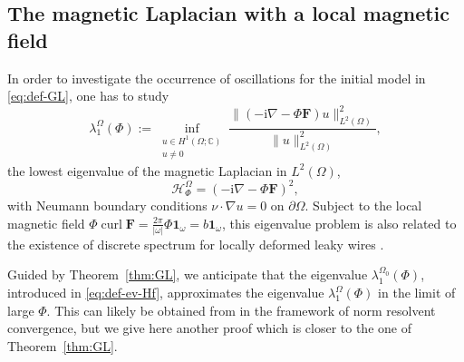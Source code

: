 \documentclass[11pt]{amsart}
\DeclareMathOperator{\curl}{curl}
\newcommand{\C}{\mathbb C}
\newcommand{\Hb}{\mathcal{H}_\Phi^{\Omega}}
\newcommand{\Fb}{\mathbf F}
\newcommand{\ii}{\mathrm i}
\theoremstyle{definition}
\numberwithin{equation}{section}
\begin{document}
\subsection{The magnetic Laplacian with a local magnetic field}
%
In order to  investigate the occurrence of oscillations for the initial model in \eqref{eq:def-GL}, one has to study
\begin{equation}\label{eq:ev-H-B}
\lambda_1^\Omega(\Phi):=\inf_{\substack{u\in H^1(\Omega;\C)\\u\not=0}}\frac{\|(-\ii\nabla-\Phi\Fb)u\|^2_{L^2(\Omega)}}{\|u\|^2_{L^2(\Omega)}},
\end{equation}
 the lowest eigenvalue of the magnetic Laplacian  in $L^2(\Omega)$,
\begin{equation}\label{eq:def-op-Om}
    \Hb= (-\ii\nabla - \Phi\Fb)^2,
\end{equation}
with Neumann boundary conditions $\nu\cdot \nabla u=0$ on \(\partial\Omega\). Subject to the local magnetic field $\Phi\curl\Fb=\frac{2\pi}{|\omega|}\Phi\mathbf 1_\omega=b\mathbf 1_\omega$, this eigenvalue problem is also related to the existence of discrete spectrum for locally deformed leaky wires \cite{BE}.

Guided by Theorem~\ref{thm:GL}, we anticipate that the eigenvalue $\lambda_1^{\Omega_0}(\Phi)$, introduced in \eqref{eq:def-ev-Hf}, approximates the eigenvalue
$\lambda_1^\Omega(\Phi)$ in the limit of large $\Phi$. This can likely be obtained from \cite{HN} in the framework of norm resolvent convergence, but we give here another proof which is closer to the one of Theorem~\ref{thm:GL}.
\end{document}
